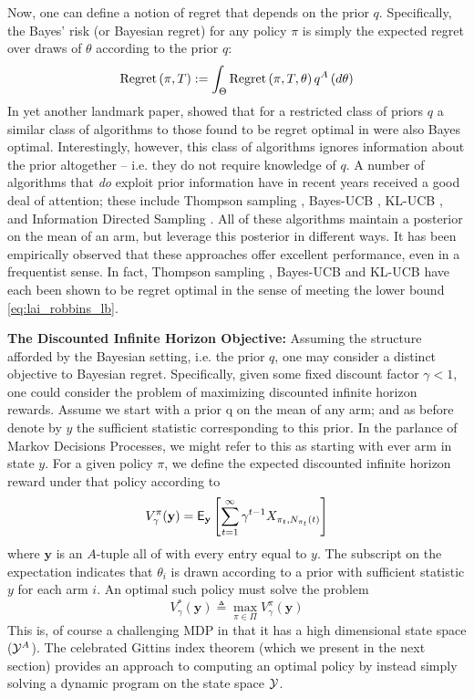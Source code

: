 Now, one can define a notion of regret that depends on the prior $q$. Specifically, the Bayes' risk (or Bayesian regret) for any policy $\pi$ is simply the expected regret over draws of $\theta$ according to the prior $q$:
\[
\textnormal{Regret} \left( \pi, T \right) := \int_\Theta \textnormal{Regret} \left( \pi, T, \theta \right) q^A\left(d\theta\right)
\]
In yet another landmark paper, \cite{lai1985asymptotically} showed that for a restricted class of priors $q$ a similar class of algorithms to those found to be regret optimal in \cite{lai1985asymptotically} were also Bayes optimal. Interestingly, however, this class of algorithms ignores information about the prior altogether -- i.e. they do not require knowledge of $q$. A number of algorithms that {\em do} exploit prior information have in recent years received a good deal of attention; these include Thompson sampling \cite{thompson1933likelihood}, Bayes-UCB \cite{kaufmann2012thompson}, KL-UCB \cite{garivier2011kl}, and Information Directed Sampling \cite{russo2014learning}. All of these algorithms maintain a posterior on the mean of an arm, but leverage this posterior in different ways. It has been empirically observed that these approaches offer excellent performance, even in a frequentist sense. In fact, Thompson sampling \cite{thompson1933likelihood}, Bayes-UCB \cite{kaufmann2012thompson} and KL-UCB \cite{garivier2011kl} have each been shown to be regret optimal in the sense of meeting the lower bound  \eqref{eq:lai_robbins_lb}. 
 
\noindent\textbf{\textsf{The Discounted Infinite Horizon Objective: }}Assuming the structure afforded by the Bayesian setting, i.e. the prior $q$, one may consider a distinct objective to Bayesian regret. Specifically, given some fixed discount factor $\gamma < 1$, one could consider the problem of maximizing discounted infinite horizon rewards. Assume we start with a prior q on the mean of any arm; and as before denote by $y$ the sufficient statistic corresponding to this prior. In the parlance of Markov Decisions Processes, we might refer to this as starting with ever arm in state $y$. For a given policy $\pi$, we define the expected discounted infinite horizon reward under that policy according to
\[
V^\pi_\gamma(\mathbf{y}) 
=
\mathsf{E}_{\mathbf{y}}
\left[
	\sum_{t=1}^\infty \gamma^{t-1} X_{\pi_t,N_{\pi_t}(t)}
\right]
\]
where $\mathbf{y}$ is an $A$-tuple all of with every entry equal to $y$. The subscript on the expectation indicates that $\theta_i$ is drawn according to a prior with sufficient statistic $y$ for each arm $i$. An optimal such policy must solve the problem
\[
V^*_\gamma(\mathbf{y}) 
\triangleq 
\max_{\pi \in \Pi} V^\pi_\gamma(\mathbf{y}) 
\]
This is, of course a challenging MDP in that it has a high dimensional state space ($\mathcal Y^A$). The celebrated Gittins index theorem (which we present in the next section) provides an approach to computing an optimal policy by instead simply solving a dynamic program on the state space $\mathcal Y$. 


